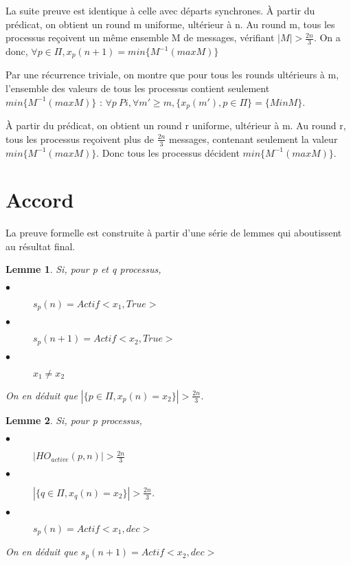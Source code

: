 \documentclass{article}
\newtheorem{lemma}{Lemme}
\begin{document}
La suite preuve est identique à celle avec départs synchrones. À partir du prédicat, on obtient un round m uniforme, ultérieur à n. Au round m, tous les processus reçoivent un même ensemble M de messages, vérifiant $| M | > \frac{2n}{3}$. On a donc, $\forall p \in \Pi, x_p(n+1) = min \{M^{-1} (max M)\}$

Par une récurrence triviale, on montre que pour tous les rounds ultérieurs à m, l'ensemble des valeurs de tous les processus contient seulement $min \{M^{-1} (max M)\}$ : $\forall p \ Pi, \forall m' \geq m, \{x_p(m'), p \in \Pi \} = \{Min M\}$.

À partir du prédicat, on obtient un round r uniforme, ultérieur à m. Au round r, tous les processus reçoivent plus de $\frac{2n}{3}$ messages, contenant seulement la valeur $min \{M^{-1} (max M)\}$. Donc tous les processus décident $min \{M^{-1} (max M)\}$.

\section{Accord}

La preuve formelle est construite à partir d'une série de lemmes qui aboutissent au résultat final.

\begin{lemma}

Si, pour p et q processus,

\begin{description}

\item[$\bullet$] $s_p(n) = Actif <x_1, True>$
\item[$\bullet$] $s_p(n+1) = Actif <x_2, True>$
\item[$\bullet$] $x_1 \neq x_2$

\end{description}

On en déduit que $| \{ p \in \Pi , x_p(n) = x_2 \} | > \frac{2n}{3}$.

\end{lemma}

\begin{lemma}

Si, pour p processus,

\begin{description}

\item[$\bullet$] $| HO_{active} (p,n) | > \frac{2n}{3}$
\item[$\bullet$] $| \{ q \in \Pi , x_q(n) = x_2 \} | > \frac{2n}{3}$.
\item[$\bullet$] $s_p(n) = Actif <x_1, dec>$

\end{description}

On en déduit que $s_p(n+1) = Actif <x_2, dec>$

\end{lemma}
\end{document}
